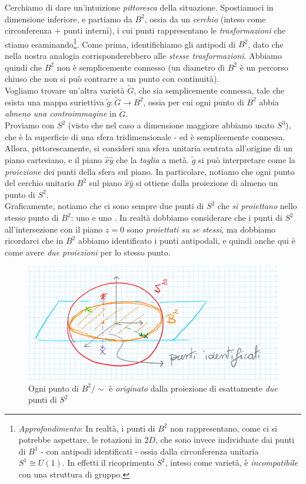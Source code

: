 \documentclass[../../FisicaTeorica.tex]{subfiles}
\begin{document}
Cerchiamo di dare un'intuizione \textit{pittoresca} della situazione. Spostiamoci in dimensione inferiore, e partiamo da $B^2$, ossia da un \textit{cerchio} (inteso come circonferenza + punti interni), i cui punti rappresentano le \textit{trasformazioni} che stiamo esaminando\footnote{\textit{Approfondimento}: In realtà, i punti di $B^2$ non rappresentano, come ci si potrebbe aspettare, le rotazioni in $2D$, che sono invece individuate dai punti di $B^1$ - con antipodi identificati - ossia dalla circonferenza unitaria $S^1 \cong U(1)$. In effetti il ricoprimento $S^2$, inteso come varietà, è \textit{incompatibile} con una struttura di gruppo.}.
Come prima, identifichiamo gli antipodi di $B^2$, dato che nella nostra analogia corrisponderebbero alle \textit{stesse trasformazioni}. Abbiamo quindi che $B^2$ non è semplicemente connesso (un diametro di $B^2$ è un percorso chiuso che non si può contrarre a un punto con continuità).\\
Vogliamo trovare un'altra varietà $\tilde{G}$, che sia semplicemente connessa, tale che esista una mappa suriettiva $\tilde{g}:\tilde{G}\to B^2$, ossia per cui ogni punto di $B^2$ abbia \textit{almeno una controimmagine} in $\tilde{G}$.\\
Proviamo con $S^2$ (visto che nel caso a dimensione maggiore abbiamo usato $S^3$), che è la superficie di una sfera tridimensionale - ed è semplicemente connessa.\\
Allora, pittorescamente, si consideri una sfera unitaria centrata all'origine di un piano cartesiano, e il piano $\hat{x}\hat{y}$ che la \textit{taglia} a metà. $\tilde{g}$ si può interpretare come la \textit{proiezione} dei punti della sfera sul piano. In particolare, notiamo che ogni punto del cerchio unitario $B^2$ sul piano $\hat{x}\hat{y}$ si ottiene dalla proiezione di almeno un punto di $S^2$.\\
Graficamente, notiamo che ci sono sempre due punti di $S^2$ che \textit{si proiettano} nello stesso punto di $B^2$: uno  e uno . In realtà dobbiamo considerare che i punti di $S^2$ all'intersezione con il piano $z=0$ sono \textit{proiettati su se stessi}, ma dobbiamo ricordarci che in $B^2$ abbiamo identificato i punti antipodali, e quindi anche qui è come avere \textit{due proiezioni} per lo stesso punto.
\begin{figure}[H]
\centering
\includegraphics[scale=0.2]{Immagini/23_11/image002.png}
\caption{Ogni punto di $B^2/\sim$ è \textit{originato} dalla proiezione di esattamente \textit{due} punti di $S^2$}
\end{figure}
\end{document}
